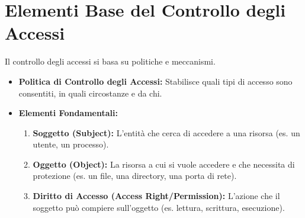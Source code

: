 \section{Elementi Base del Controllo degli Accessi}
Il controllo degli accessi si basa su politiche e meccanismi.
\begin{itemize}
    \item \textbf{Politica di Controllo degli Accessi:} Stabilisce quali tipi di accesso sono consentiti, in quali circostanze e da chi.
    \item \textbf{Elementi Fondamentali:}
    \begin{enumerate}
        \item \textbf{Soggetto (Subject):} L'entità che cerca di accedere a una risorsa (es. un utente, un processo).
        \item \textbf{Oggetto (Object):} La risorsa a cui si vuole accedere e che necessita di protezione (es. un file, una directory, una porta di rete).
        \item \textbf{Diritto di Accesso (Access Right/Permission):} L'azione che il soggetto può compiere sull'oggetto (es. lettura, scrittura, esecuzione).
    \end{enumerate}
\end{itemize}

